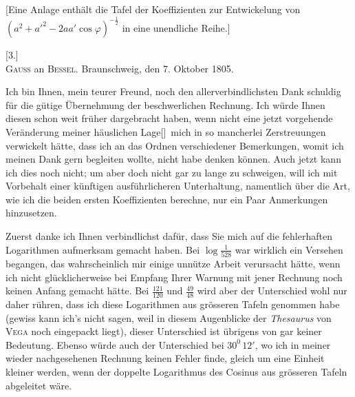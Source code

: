 [Eine Anlage enthält die Tafel der Koeffizienten zur Entwickelung von
$(a^2+a'^2-2aa'\cos\varphi)^{-\frac{1}{2}}$ in eine unendliche Reihe.]
\begin{center}[3.]\\[3pt]
\textsc{Gauss} an \textsc{Bessel}. Braunschweig, den 7. Oktober 1805.\end{center}
\noindent\hspace*{\parindent}Ich bin Ihnen, mein teurer Freund, noch den allerverbindlichsten Dank
schuldig für die gütige Übernehmung der beschwerlichen Rechnung. Ich würde
\clearpage{}
\setcounter{footnote}{0}
\noindent Ihnen diesen schon weit früher dargebracht haben, wenn nicht eine jetzt vorgehende
Veränderung meiner häuslichen Lage\begingroup[\footnotemark]\renewcommand{\thefootnote}{[\arabic{footnote})}\footnotetext{Am 9. Oktober 1805 fand \textsc{Gauss}’ Vermählung mit \textsc{Johanna Osthoff} statt.]}\endgroup\ mich in so mancherlei Zerstreuungen
verwickelt hätte, dass ich an das Ordnen verschiedener Bemerkungen,
womit ich meinen Dank gern begleiten wollte, nicht habe denken können.
Auch jetzt kann ich dies noch nicht; um aber doch nicht gar zu lange zu
schweigen, will ich mit Vorbehalt einer künftigen ausführlicheren Unterhaltung,
namentlich über die Art, wie ich die beiden ersten Koeffizienten berechne,
nur ein Paar Anmerkungen hinzusetzen.

Zuerst danke ich Ihnen verbindlichst dafür, dass Sie mich auf die fehlerhaften
Logarithmen aufmerksam gemacht haben. Bei $\log\frac{1}{528}$ war wirklich
ein Versehen begangen, das wahrscheinlich mir einige unnütze Arbeit verursacht
hätte, wenn ich nicht glücklicherweise bei Empfang Ihrer Warnung
mit jener Rechnung noch keinen Anfang gemacht hätte. Bei $\frac{121}{120}$ und $\frac{49}{48}$
wird aber der Unterschied wohl nur daher rühren, dass ich diese Logarithmen
aus grösseren Tafeln genommen habe (gewiss kann ich’s nicht sagen, weil in
diesem Augenblicke der \textit{Thesaurus} von \textsc{Vega} noch eingepackt liegt), dieser
Unterschied ist übrigens von gar keiner Bedeutung. Ebenso würde auch der
Unterschied bei $30^0\,12'$, wo ich in meiner wieder nachgesehenen Rechnung
keinen Fehler finde, gleich um eine Einheit kleiner werden, wenn der doppelte
Logarithmus des Cosinus aus grösseren Tafeln abgeleitet wäre.

